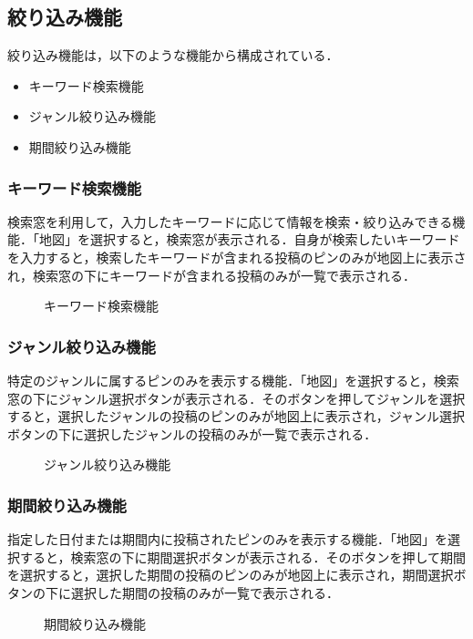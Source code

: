 \subsection{絞り込み機能}
絞り込み機能は，以下のような機能から構成されている．

\begin{itemize}
  \item キーワード検索機能
  \item ジャンル絞り込み機能
  \item 期間絞り込み機能
\end{itemize}

\subsubsection{キーワード検索機能}
検索窓を利用して，入力したキーワードに応じて情報を検索・絞り込みできる機能．「地図」を選択すると，検索窓が表示される．自身が検索したいキーワードを入力すると，検索したキーワードが含まれる投稿のピンのみが地図上に表示され，検索窓の下にキーワードが含まれる投稿のみが一覧で表示される．

\begin{figure}[H]
    \centering
    
    \caption{キーワード検索機能}
    \label{fig:filter_gen1}
\end{figure}

\subsubsection{ジャンル絞り込み機能}
特定のジャンルに属するピンのみを表示する機能．「地図」を選択すると，検索窓の下にジャンル選択ボタンが表示される．そのボタンを押してジャンルを選択すると，選択したジャンルの投稿のピンのみが地図上に表示され，ジャンル選択ボタンの下に選択したジャンルの投稿のみが一覧で表示される．

\begin{figure}[H]
    \centering
    
    \caption{ジャンル絞り込み機能}
    \label{fig:filter_gen2}
\end{figure}


\subsubsection{期間絞り込み機能}
指定した日付または期間内に投稿されたピンのみを表示する機能．「地図」を選択すると，検索窓の下に期間選択ボタンが表示される．そのボタンを押して期間を選択すると，選択した期間の投稿のピンのみが地図上に表示され，期間選択ボタンの下に選択した期間の投稿のみが一覧で表示される．

\begin{figure}[H]
    \centering
    
    \caption{期間絞り込み機能}
    \label{fig:filter_gen3}
\end{figure}
